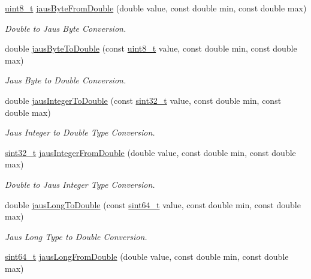 \begin{CompactItemize}
\hyperlink{libdrdc_8h_ba7bc1797add20fe3efdf37ced1182c5}{uint8\_\-t} \hyperlink{group__data__conv_g0d27787fcd35af9939ffbf853b2c0349}{jausByteFromDouble} (double value, const double min, const double max)
\begin{CompactList}\small\item\em Double to Jaus Byte Conversion. \item\end{CompactList}\item 
double \hyperlink{group__data__conv_gdd32c075f72b542276855114fc4ddefd}{jausByteToDouble} (const \hyperlink{libdrdc_8h_ba7bc1797add20fe3efdf37ced1182c5}{uint8\_\-t} value, const double min, const double max)
\begin{CompactList}\small\item\em Jaus Byte to Double Conversion. \item\end{CompactList}\item 
double \hyperlink{group__data__conv_g77978e778543c4b17b6e90f9c2d19f0d}{jausIntegerToDouble} (const \hyperlink{libdrdc_8h_77a3fd933dcccb072101ccc1809951c1}{sint32\_\-t} value, const double min, const double max)
\begin{CompactList}\small\item\em Jaus Integer to Double Type Conversion. \item\end{CompactList}\item 
\hyperlink{libdrdc_8h_77a3fd933dcccb072101ccc1809951c1}{sint32\_\-t} \hyperlink{group__data__conv_g9202437ca54232872b3b21cf829eb255}{jausIntegerFromDouble} (double value, const double min, const double max)
\begin{CompactList}\small\item\em Double to Jaus Integer Type Conversion. \item\end{CompactList}\item 
double \hyperlink{group__data__conv_g800a7c2530f63a5e6bc279ff80b58053}{jausLongToDouble} (const \hyperlink{libdrdc_8h_07ccfa65c976c915ad50664a7b93f079}{sint64\_\-t} value, const double min, const double max)
\begin{CompactList}\small\item\em Jaus Long Type to Double Conversion. \item\end{CompactList}\item 
\hyperlink{libdrdc_8h_07ccfa65c976c915ad50664a7b93f079}{sint64\_\-t} \hyperlink{group__data__conv_g73f3ce33dc453cc3a03ab09735084140}{jausLongFromDouble} (double value, const double min, const double max)

\end{CompactItemize}
